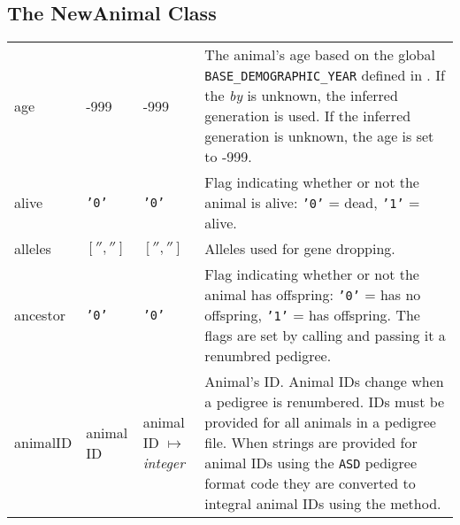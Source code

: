 \subsection{The NewAnimal Class}
\label{sec:objects-animal-objects-new-animal}
\begin{center}
    \tablelasttail{\hline}
    \label{tbl:objects-animal-objects-new-animal-attributes}
    \begin{xtabular}{l|l|l|p{2.5in}}
        age & -999 & -999 & The animal's age based on the global \texttt{BASE_DEMOGRAPHIC_YEAR} defined in . If the \emph{by} is unknown, the inferred generation is used.  If the inferred generation is unknown, the age is set to -999. \\
        alive & \texttt{'0'} & \texttt{'0'} & Flag indicating whether or not the animal is alive: \texttt{'0'} = dead, \texttt{'1'} = alive. \\
        alleles & $['', '']$ & $['', '']$ & Alleles used for gene dropping. \\
        ancestor & \texttt{'0'} & \texttt{'0'} & Flag indicating whether or not the animal has offspring: \texttt{'0'} = has no offspring, \texttt{'1'} = has offspring. The flags are set by calling  and passing it a renumbred pedigree. \\
        animalID & animal ID & animal ID $\mapsto$ \emph{integer} & Animal's ID. Animal IDs change when a pedigree is renumbered. IDs must be provided for all animals in a pedigree file. When strings are provided for animal  IDs using the \texttt{ASD} pedigree format code they are converted to integral animal IDs using the  method.\\

\end{xtabular}
\end{center}
